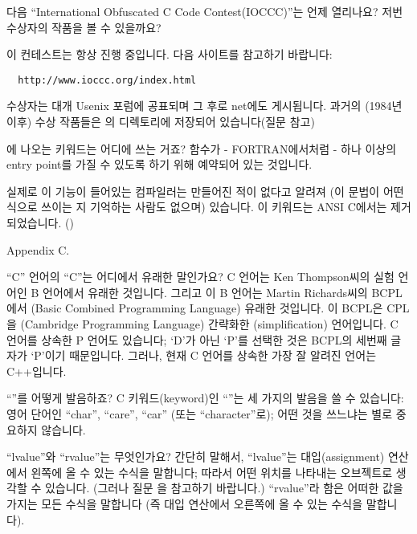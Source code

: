 \begin{faq}
	다음 ``International Obfuscated C Code Contest(IOCCC)''는 언제
	열리나요? 저번 수상자의 작품을 볼 수 있을까요?

\A
	이 컨테스트는 항상 진행 중입니다. 다음 사이트를 참고하기 바랍니다:
\begin{verbatim}
  http://www.ioccc.org/index.html
\end{verbatim}

	수상자는 대개 Usenix 포럼에 공표되며 그 후로 net에도 게시됩니다.
	과거의 (1984년 이후) 수상 작품들은 의
	 디렉토리에 저장되어 있습니다(질문  참고)
\end{faq}

\begin{faq}
	\cite{kr1}에 나오는  키워드는 어디에 쓰는 거죠?
\A
	함수가 - FORTRAN에서처럼 - 하나 이상의 entry point를 가질 수
	있도록 하기 위해 예약되어 있는 것입니다.

	실제로 이 기능이 들어있는 컴파일러는 만들어진 적이 없다고
	알려져 (이 문법이 어떤 식으로 쓰이는 지 기억하는 사람도
	없으며) 있습니다.  이 키워드는 ANSI C에서는 제거되었습니다.
	()

\R
	\cite{kr2}  Appendix C.
\end{faq}

\begin{faq}
	``C'' 언어의 ``C''는 어디에서 유래한 말인가요?
\A
	C 언어는 Ken Thompson씨의 실험 언어인 B 언어에서 유래한 것입니다.
	그리고 이 B 언어는 Martin Richards씨의 BCPL에서 (Basic Combined
	Programming Language) 유래한 것입니다.  이 BCPL은
	CPL을 (Cambridge Programming Language) 간략화한
	(simplification) 언어입니다.  C 언어를 상속한
	P 언어도 있습니다; `D'가 아닌 `P'를 선택한 것은 BCPL의 세번째
	글자가 `P'이기 때문입니다.  그러나, 현재 C 언어를 상속한 가장
	잘 알려진 언어는 C++입니다.
\end{faq}

\begin{faq}
	``''를 어떻게 발음하죠?
\A
	C 키워드(keyword)인 ``''는 세 가지의 발음을 쓸 수 있습니다:
	영어 단어인 ``char'', ``care'', ``car'' (또는 ``character''로);
	어떤 것을 쓰느냐는 별로 중요하지 않습니다.
\end{faq}

\begin{faq}
	``lvalue''와 ``rvalue''는 무엇인가요?
\A
	간단히 말해서, ``lvalue''는 대입(assignment) 연산에서
	왼쪽에 올 수 있는 수식을 말합니다; 따라서 어떤 위치를 나타내는
	오브젝트로 생각할 수 있습니다.  (그러나 질문 을 참고하기 바랍니다.)
	``rvalue''라 함은 어떠한 값을 가지는 모든 수식을 말합니다 (즉
	대입 연산에서 오른쪽에 올 수 있는 수식을 말합니다).
\end{faq}

